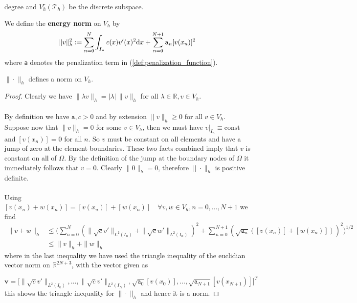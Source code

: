 degree and $V_h^r(\mathcal{T}_h)$ be the discrete subspace.
\begin{definition}
    We define the \textbf{energy norm} on $V_h$ by 
    \begin{equation}
        \label{def:energy_norm}
        \|v\|_h^2 := \sum_{n=0}^{N} \int_{I_n} c(x)v'(x)^2\text{d}x + \sum_{n=0}^{N+1}{\normalfont\texttt{a}_n}[v(x_n)]^2 
    \end{equation}
    where {\normalfont\texttt{a}} denotes the penalization term in (\ref{def:penalization_function}).
\end{definition}
\begin{lemma}
    $\|\cdot\|_h$ defines a norm on $V_h$.
\end{lemma}
\begin{proof}
    Clearly we have $\|\lambda v\|_h =|\lambda|\, \|v\|_h$ for all $\lambda \in \mathbb{R}, v\in V_h$. \\ \\
    By definition we have $\texttt{a}, c>0$ and by extension $\|v\|_h \geq 0$ for all
    $v\in V_h$. Suppose now that $\|v\|_h = 0$ for some $v\in V_h$, then we must have $v|_{I_n} \equiv \text{const}$ 
    and $[v(x_n)] = 0$ for all $n$. So $v$ must be constant on all elements and have a jump of zero at the element boundaries.
    These two facts combined imply that $v$ is constant on all of $\Omega$. By the definition of the jump 
    at the boundary nodes of $\Omega$ it immediately follows that $v=0$. Clearly
    $\|0\|_h=0$, therefore $\|\cdot\|_h$ is positive definite. \\ \\
    Using $[v(x_n) + w(x_n)] = [v(x_n)] + [w(x_n)] \quad \forall v,w \in V_h, n = 0,\ldots,N+1$ we find
    \begin{align*}
        \|v+w\|_h &\leq \Big(\sum_{n=0}^{N} (\|\sqrt{c}v'\|_{L^2(I_n)}+\|\sqrt{c}w'\|_{L^2(I_n)})^2 + 
        \sum_{n=0}^{N+1} (\sqrt{\texttt{a}_n}([v(x_n)] + [w(x_n)]))^2\Big)^{1/2} \\
        &\leq \|v\|_h + \|w\|_h
    \end{align*}
    where in the last inequality we have used the triangle inequality of the euclidian vector norm on $\mathbb{R}^{2N+3}$, with the vector given
    as 
    
    \[
    \textbf{v} = \big[\|\sqrt{c}v'\|_{L^2(I_0)},\ldots,\|\sqrt{c}v'\|_{L^2(I_N)}, \sqrt{\texttt{a}_0}[v(x_0)],\ldots,\sqrt{\texttt{a}_{N+1}}[v(x_{N+1})]\big]^T
    \]
    this shows the triangle inequality for $\|\cdot\|_h$ and hence it is a norm.
\end{proof}

